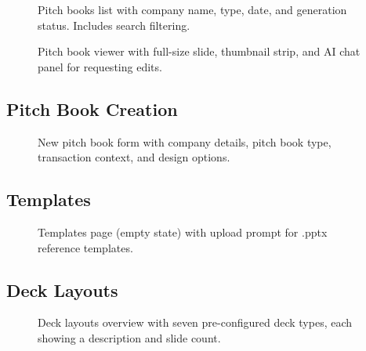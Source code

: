 \begin{figure}[H]
\centering
{}
\caption{Pitch books list with company name, type, date, and generation status. Includes search filtering.}
\label{fig:app-pitchbooks-list}
\end{figure}

\begin{figure}[H]
\centering
{}
\caption{Pitch book viewer with full-size slide, thumbnail strip, and AI chat panel for requesting edits.}
\label{fig:app-pitchbook-viewer}
\end{figure}

\newpage

\subsection*{Pitch Book Creation}

\begin{figure}[H]
\centering
{}
\caption{New pitch book form with company details, pitch book type, transaction context, and design options.}
\label{fig:app-new-pitchbook}
\end{figure}

\newpage

\subsection*{Templates}

\begin{figure}[H]
\centering
{}
\caption{Templates page (empty state) with upload prompt for .pptx reference templates.}
\label{fig:app-templates}
\end{figure}

\newpage

\subsection*{Deck Layouts}

\begin{figure}[H]
\centering
{}
\caption{Deck layouts overview with seven pre-configured deck types, each showing a description and slide count.}
\label{fig:app-layouts}
\end{figure}

